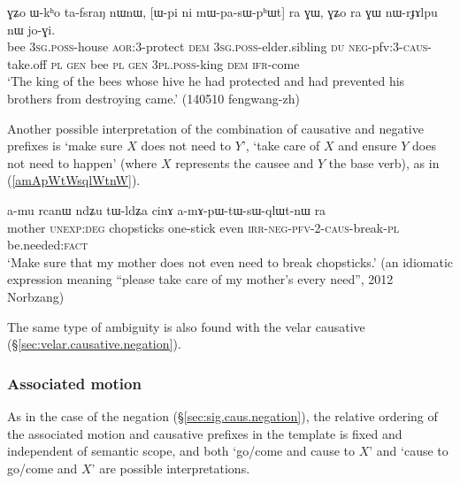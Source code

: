 \begin{exe}
\ex \label{ex:mWpasWphWt}
\gll ɣʑo ɯ-kʰo ta-fsraŋ nɯnɯ, [ɯ-pi ni mɯ-pa-sɯ-pʰɯt] ra ɣɯ, ɣʑo ra ɣɯ nɯ-rɟɤlpu nɯ jo-ɣi. \\
bee \textsc{3sg}.\textsc{poss}-house \textsc{aor}:3\flobv{}-protect \textsc{dem} \textsc{3sg}.\textsc{poss}-elder.sibling \textsc{du} \textsc{neg}-pfv:3\flobv{}-\textsc{caus}-take.off \textsc{pl} \textsc{gen} bee \textsc{pl} \textsc{gen} \textsc{3pl}.\textsc{poss}-king \textsc{dem} \textsc{ifr}-come \\
\glt `The king of the bees whose hive he had protected and had prevented his brothers from destroying came.' (140510 fengwang-zh)
\end{exe}


Another possible interpretation of the combination of causative and negative prefixes is `make sure $X$ does not need to $Y$', `take care of $X$ and ensure $Y$ does not need to happen' (where $X$ represents the causee and $Y$ the base verb), as in (\ref{amApWtWsqlWtnW}).

\begin{exe}
\ex \label{amApWtWsqlWtnW}
\gll   a-mu rcanɯ ndʑu tɯ-ldʑa cinɤ  a-mɤ-pɯ-tɯ-sɯ-qlɯt-nɯ ra \\
 mother \textsc{unexp}:\textsc{deg} chopsticks one-stick even  \textsc{irr}-\textsc{neg}-\textsc{pfv}-2-\textsc{caus}-break-\textsc{pl} be.needed:\textsc{fact} \\
 \glt   `Make sure that my mother does not even need to break chopsticks.' (an idiomatic expression meaning ``please take care of my mother's every need'', 2012 Norbzang)
\end{exe}

The same type of ambiguity is also found with the velar causative (§\ref{sec:velar.causative.negation}).

\subsubsection{Associated motion} \label{sec:sig.caus.AM} 
 
As in the case of the negation (§\ref{sec:sig.caus.negation}), the relative ordering of the associated motion and causative prefixes in the template is fixed and independent of semantic scope, and both  `go/come and cause to $X$' and `cause to go/come and $X$' are possible interpretations.

